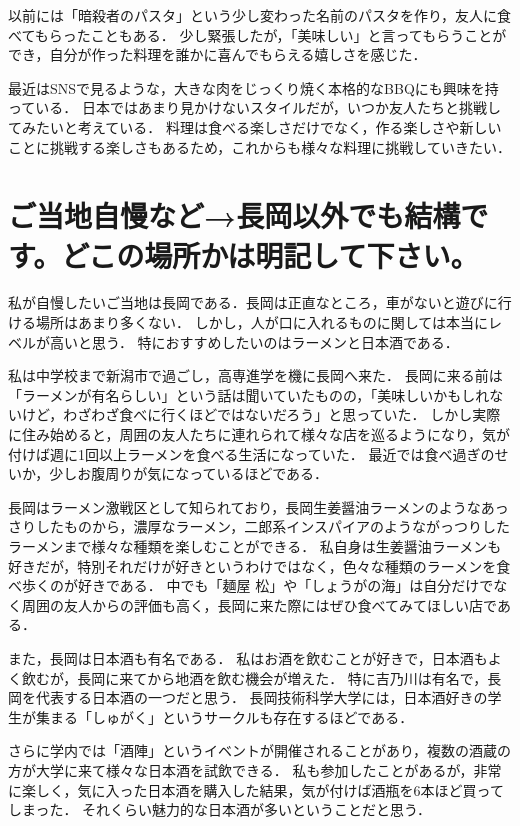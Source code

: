 \documentclass[titlepage,a4paper]{jsarticle}
\begin{document}
以前には「暗殺者のパスタ」という少し変わった名前のパスタを作り，友人に食べてもらったこともある．
少し緊張したが，「美味しい」と言ってもらうことができ，自分が作った料理を誰かに喜んでもらえる嬉しさを感じた．

最近はSNSで見るような，大きな肉をじっくり焼く本格的なBBQにも興味を持っている．
日本ではあまり見かけないスタイルだが，いつか友人たちと挑戦してみたいと考えている．
料理は食べる楽しさだけでなく，作る楽しさや新しいことに挑戦する楽しさもあるため，これからも様々な料理に挑戦していきたい．

\section{ご当地自慢など→長岡以外でも結構です。どこの場所かは明記して下さい。}
私が自慢したいご当地は長岡である．長岡は正直なところ，車がないと遊びに行ける場所はあまり多くない．
しかし，人が口に入れるものに関しては本当にレベルが高いと思う．
特におすすめしたいのはラーメンと日本酒である．

私は中学校まで新潟市で過ごし，高専進学を機に長岡へ来た．
長岡に来る前は「ラーメンが有名らしい」という話は聞いていたものの，「美味しいかもしれないけど，わざわざ食べに行くほどではないだろう」と思っていた．
しかし実際に住み始めると，周囲の友人たちに連れられて様々な店を巡るようになり，気が付けば週に1回以上ラーメンを食べる生活になっていた．
最近では食べ過ぎのせいか，少しお腹周りが気になっているほどである．

長岡はラーメン激戦区として知られており，長岡生姜醤油ラーメンのようなあっさりしたものから，濃厚なラーメン，二郎系インスパイアのようながっつりしたラーメンまで様々な種類を楽しむことができる．
私自身は生姜醤油ラーメンも好きだが，特別それだけが好きというわけではなく，色々な種類のラーメンを食べ歩くのが好きである．
中でも「麺屋 松」や「しょうがの海」は自分だけでなく周囲の友人からの評価も高く，長岡に来た際にはぜひ食べてみてほしい店である．

また，長岡は日本酒も有名である．
私はお酒を飲むことが好きで，日本酒もよく飲むが，長岡に来てから地酒を飲む機会が増えた．
特に吉乃川は有名で，長岡を代表する日本酒の一つだと思う．
長岡技術科学大学には，日本酒好きの学生が集まる「しゅがく」というサークルも存在するほどである．

さらに学内では「酒陣」というイベントが開催されることがあり，複数の酒蔵の方が大学に来て様々な日本酒を試飲できる．
私も参加したことがあるが，非常に楽しく，気に入った日本酒を購入した結果，気が付けば酒瓶を6本ほど買ってしまった．
それくらい魅力的な日本酒が多いということだと思う．
\end{document}

